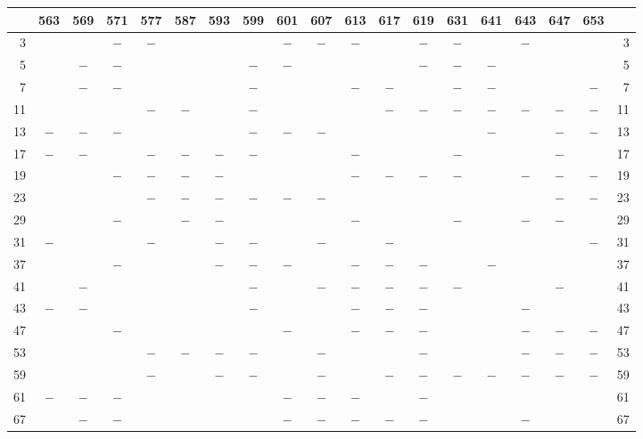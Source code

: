 \clearpage
{}%
\begin{center}\begingroup\fontsize{8}{10.5}\selectfont\setlength{\tabcolsep}{2pt}
\begin{tabular}{r|c|c|c|c|c|c|c|c|c|c|c|c|c|c|c|c|c|r}
\hline
 & 563 & 569 & 571 & 577 & 587 & 593 & 599 & 601 & 607 & 613 & 617 & 619 & 631 & 641 & 643 & 647 & 653 & \\
\hline
3 &  &  & $-$ & $-$ &  &  &  & $-$ & $-$ & $-$ &  & $-$ & $-$ &  & $-$ &  &  & 3\\
5 &  & $-$ & $-$ &  &  &  & $-$ & $-$ &  &  &  & $-$ & $-$ & $-$ &  &  &  & 5\\
7 &  & $-$ & $-$ &  &  &  & $-$ &  &  & $-$ & $-$ &  & $-$ & $-$ &  &  & $-$ & 7\\
11 &  &  &  & $-$ & $-$ &  & $-$ &  &  &  & $-$ & $-$ & $-$ & $-$ & $-$ & $-$ & $-$ & 11\\
13 & $-$ & $-$ & $-$ &  &  &  & $-$ & $-$ & $-$ &  &  &  &  & $-$ &  & $-$ & $-$ & 13\\
17 & $-$ & $-$ &  & $-$ & $-$ & $-$ & $-$ &  &  & $-$ &  &  & $-$ &  &  & $-$ &  & 17\\
19 &  &  & $-$ & $-$ & $-$ & $-$ &  &  &  & $-$ & $-$ & $-$ & $-$ &  & $-$ & $-$ & $-$ & 19\\
23 &  &  &  & $-$ & $-$ & $-$ & $-$ & $-$ & $-$ &  &  &  &  &  &  & $-$ & $-$ & 23\\
29 &  &  & $-$ &  & $-$ & $-$ &  &  &  & $-$ &  &  & $-$ &  & $-$ & $-$ &  & 29\\
31 & $-$ &  &  & $-$ &  & $-$ & $-$ &  & $-$ &  & $-$ &  &  &  &  &  & $-$ & 31\\
37 &  &  & $-$ &  &  & $-$ & $-$ & $-$ &  & $-$ & $-$ & $-$ &  & $-$ &  &  &  & 37\\
41 &  & $-$ &  &  &  &  & $-$ &  & $-$ & $-$ & $-$ & $-$ & $-$ &  &  & $-$ &  & 41\\
43 & $-$ & $-$ &  &  &  &  & $-$ &  &  & $-$ & $-$ & $-$ &  &  & $-$ &  &  & 43\\
47 &  &  & $-$ &  &  &  &  & $-$ &  & $-$ & $-$ & $-$ &  &  & $-$ & $-$ & $-$ & 47\\
53 &  &  &  & $-$ & $-$ & $-$ & $-$ &  & $-$ &  &  & $-$ &  &  & $-$ & $-$ & $-$ & 53\\
59 &  &  &  & $-$ &  & $-$ & $-$ &  & $-$ &  & $-$ & $-$ & $-$ & $-$ & $-$ & $-$ & $-$ & 59\\
61 & $-$ & $-$ & $-$ &  &  &  &  & $-$ & $-$ & $-$ &  & $-$ &  &  &  &  &  & 61\\
67 &  & $-$ & $-$ &  &  &  &  & $-$ & $-$ & $-$ & $-$ & $-$ &  &  & $-$ &  &  & 67\\

\end{tabular}
\end{center}
